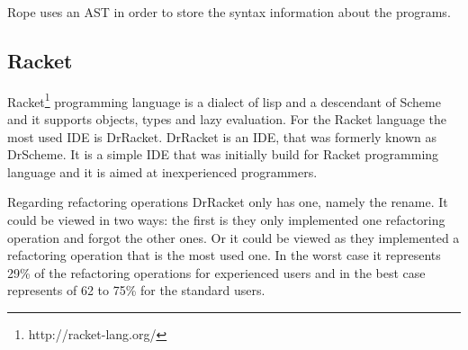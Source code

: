 Rope uses an AST in order to store the syntax information about the programs.








\subsection{Racket}

Racket\footnote{http://racket-lang.org/} programming language is a dialect of lisp and a descendant of Scheme and it supports objects, types and lazy evaluation.
For the Racket language the most used IDE is DrRacket. 
DrRacket is an IDE, that was formerly known as DrScheme. 
It is a simple IDE that was initially build for Racket programming language and it is aimed at inexperienced programmers.

Regarding refactoring operations DrRacket only has one, namely the rename. 
It could be viewed in two ways: the first is they only implemented one refactoring operation and forgot the other ones.
Or it could be viewed as they implemented a refactoring operation that is the most used one. 
In the worst case it represents 29\% of the refactoring operations for experienced users and in the best case represents of 62 to 75\% for the standard users. 




